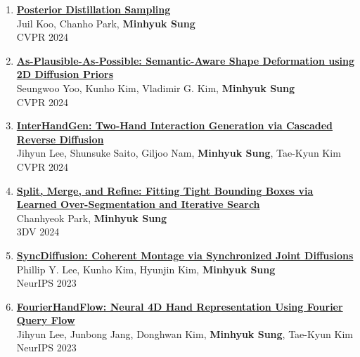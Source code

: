 \documentclass[letterpaper,10pt]{article} %
\newcommand{\blankline}{\quad\pagebreak[2]}
\begin{document}
{{\begin{enumerate}
\item \label{cvpr24_3}
\href{https://arxiv.org/abs/2311.13831}{\textbf{Posterior Distillation Sampling}}\\
Juil Koo, Chanho Park, \textbf{Minhyuk Sung}\\
CVPR 2024\\
\blankline

\item \label{cvpr24_2}
\href{https://arxiv.org/abs/2311.16739}{\textbf{As-Plausible-As-Possible: Semantic-Aware Shape Deformation using 2D Diffusion Priors}}\\
Seungwoo Yoo, Kunho Kim, Vladimir G. Kim, \textbf{Minhyuk Sung}\\
CVPR 2024\\
\blankline

\item \label{cvpr24_1}
\href{https://arxiv.org/abs/2403.17422}{\textbf{InterHandGen: Two-Hand Interaction Generation via Cascaded Reverse Diffusion}}\\
Jihyun Lee, Shunsuke Saito, Giljoo Nam, \textbf{Minhyuk Sung}, Tae-Kyun Kim\\
CVPR 2024\\
\blankline

\item \label{3dv24}
\href{https://arxiv.org/abs/2304.04336}{\textbf{Split, Merge, and Refine: Fitting Tight Bounding Boxes via Learned Over-Segmentation and Iterative Search}}\\
Chanhyeok Park, \textbf{Minhyuk Sung}\\
3DV 2024\\
\blankline

\item \label{neurips23_2}
\href{https://arxiv.org/abs/2306.05178}{\textbf{SyncDiffusion: Coherent Montage via Synchronized Joint Diffusions}}\\
Phillip Y. Lee, Kunho Kim, Hyunjin Kim, \textbf{Minhyuk Sung}\\
NeurIPS 2023\\
\blankline

\item \label{neurips23_1}
\href{https://arxiv.org/abs/2307.08100}{\textbf{FourierHandFlow: Neural 4D Hand Representation Using Fourier Query Flow}}\\
Jihyun Lee, Junbong Jang, Donghwan Kim, \textbf{Minhyuk Sung}, Tae-Kyun Kim\\
NeurIPS 2023\\
\blankline


\end{enumerate}}}
\end{document}

